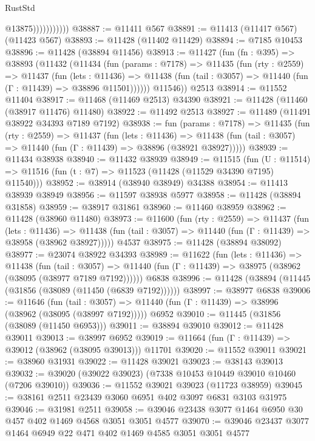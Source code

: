 \begin{lexlean}{RustStd}
\begin{coremodule}
                          @13875)))))))))))
@38887 := @11411 @567
@38891 := @11413 (@11417 @567) (@11423 @567)
@38893 := @11428 (@11402 @11429)
@38894 := @7185 @10453
@38896 := @11428 (@38894 @11456)
@38913 := @11427
    (fun (fn : @395) =>
    @38893
      (@11432
        (@11434
          (fun (params : @7178) =>
          @11435
            (fun (rty : @2559) =>
            @11437
              (fun (lets : @11436) =>
              @11438 (fun (tail : @3057) => @11440 (fun (Γ : @11439) => @38896 @11501))))))
        @11546))
    @2513
@38914 := @11552 @11404
@38917 := @11468 (@11469 @2513) @34390
@38921 := @11428 (@11460 (@38917 @11476) @11480)
@38922 := @11492 @2513
@38927 := @11489 (@11491 @38922 @34393 @7189 @7192)
@38938 := fun (params : @7178) =>
  @11435
    (fun (rty : @2559) =>
    @11437
      (fun (lets : @11436) =>
      @11438 (fun (tail : @3057) => @11440 (fun (Γ : @11439) => @38896 (@38921 @38927)))))
@38939 := @11434 @38938
@38940 := @11432 @38939
@38949 := @11515
    (fun (U : @11514) => @11516 (fun (t : @7) => @11523 (@11428 (@11529 @34390 @7195) @11540)))
@38952 := @38914 (@38940 @38949) @34388
@38954 := @11413 @38939 @38949
@38956 := @11597 @38938 @5977
@38958 := @11428 (@38894 @31858)
@38959 := @38917 @31861
@38960 := @11460 @38959
@38962 := @11428 (@38960 @11480)
@38973 := @11600
    (fun (rty : @2559) =>
    @11437
      (fun (lets : @11436) =>
      @11438 (fun (tail : @3057) => @11440 (fun (Γ : @11439) => @38958 (@38962 @38927)))))
    @4537
@38975 := @11428 (@38894 @38092)
@38977 := @23074 @38922 @34393
@38989 := @11622
    (fun (lets : @11436) =>
    @11438
      (fun (tail : @3057) =>
      @11440 (fun (Γ : @11439) => @38975 (@38962 (@38095 (@38977 @7189 @7192))))))
    @6838
@38996 := @11428 (@38894 (@11445 (@31856 (@38089 (@11450 (@6839 @7192))))))
@38997 := @38977 @6838
@39006 := @11646
    (fun (tail : @3057) => @11440 (fun (Γ : @11439) => @38996 (@38962 (@38095 (@38997 @7192)))))
    @6952
@39010 := @11445 (@31856 (@38089 (@11450 @6953)))
@39011 := @38894 @39010
@39012 := @11428 @39011
@39013 := @38997 @6952
@39019 := @11664 (fun (Γ : @11439) => @39012 (@38962 (@38095 @39013))) @11701
@39020 := @11552 @39011
@39021 := @38960 @31931
@39022 := @11428 @39021
@39023 := @38143 @39013
@39032 := @39020 (@39022 @39023) (@7338 @10453 @10449 @39010 @10460 (@7206 @39010))
@39036 := @11552 @39021 @39023 (@11723 @38959)
@39045 := @38161 @2511 @23439 @3060 @6951 @402 @3097 @6831 @3103 @31975
@39046 := @31981 @2511
@39058 := @39046 @23438 @3077 @1464 @6950 @30 @457 @402 @1469 @4568 @3051 @3051 @4577
@39070 := @39046 @23437 @3077 @1464 @6949 @22 @471 @402 @1469 @4585 @3051 @3051 @4577

\end{coremodule}
\end{lexlean}
